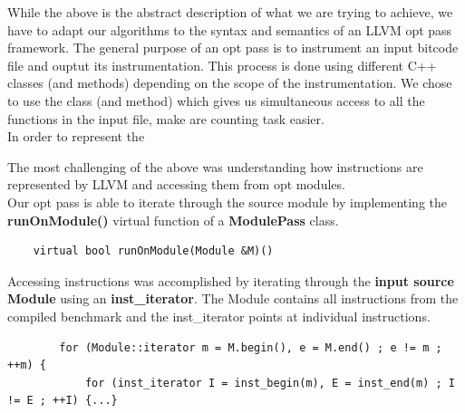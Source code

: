While the above is the abstract description of what we are trying to achieve, we have to adapt our algorithms to the syntax and semantics of an LLVM opt pass framework. The general purpose of an opt pass is to instrument an input bitcode file and ouptut its instrumentation. This process is done using different C++ classes (and methods) depending on the scope of the instrumentation. We chose to use the  class (and  method) which gives us simultaneous access to all the functions in the input file, make are counting task easier. \\

In order to represent the 

The most challenging of the above was understanding how instructions are represented by LLVM and accessing them from opt modules.\\

Our opt pass is able to iterate through the source module by implementing the \textbf{runOnModule()} virtual function of a \textbf{ModulePass} class.

\begin{frame}[fragile]
\begin{lstlisting}
    virtual bool runOnModule(Module &M)()
\end{lstlisting}
\end{frame}

Accessing instructions was accomplished by iterating through the \textbf{input source} \textbf{Module} using an \textbf{inst\_iterator}. The Module contains all instructions from the compiled benchmark and the inst\_iterator points at individual instructions.\\

\begin{frame}[fragile]
\begin{lstlisting}
    	for (Module::iterator m = M.begin(), e = M.end() ; e != m ; ++m) {
			for (inst_iterator I = inst_begin(m), E = inst_end(m) ; I != E ; ++I) {...}
\end{lstlisting}
\end{frame}


